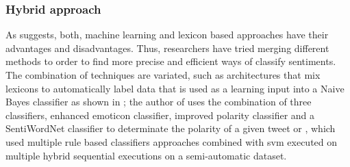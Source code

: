 \subsubsection{Hybrid approach}
\label{subsubsec:techniques_hybrid}

As \cite{thakkar2015approaches} suggests, both, machine learning and lexicon based approaches have their advantages and disadvantages. Thus, researchers have tried merging different methods to order to find more precise and efficient ways of classify sentiments. The combination of techniques are variated, such as architectures that mix lexicons to automatically label data that is used as a learning input into a Naive Bayes classifier as shown in \cite{pak2010twitter}; the author of \cite{khan2014tom} uses the combination of three classifiers, enhanced emoticon classifier, improved polarity classifier and a SentiWordNet classifier to determinate the polarity of a given tweet or \cite{prabowo2009sentiment}, which used multiple rule based classifiers approaches combined with \acrshort{svm} executed on multiple hybrid sequential executions on a semi-automatic dataset.